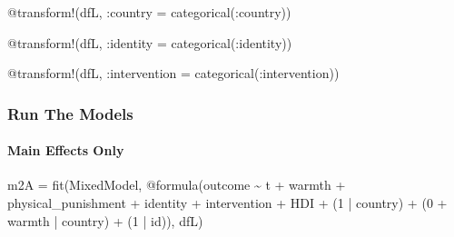 \documentclass[
  letterpaper,
  DIV=11,
  numbers=noendperiod]{scrreprt}
\let\oldparagraph\paragraph
\renewcommand{\paragraph}[1]{\oldparagraph{#1}\mbox{}}
\newenvironment{Shaded}{\begin{snugshade}}{\end{snugshade}}
\newcommand{\FloatTok}[1]{\textcolor[rgb]{0.68,0.00,0.00}{#1}}
\newcommand{\FunctionTok}[1]{\textcolor[rgb]{0.28,0.35,0.67}{#1}}
\newcommand{\NormalTok}[1]{\textcolor[rgb]{0.00,0.23,0.31}{#1}}
\newcommand{\OperatorTok}[1]{\textcolor[rgb]{0.37,0.37,0.37}{#1}}
\newcommand{\PreprocessorTok}[1]{\textcolor[rgb]{0.68,0.00,0.00}{#1}}
\begin{document}
\begin{Shaded}
\begin{Highlighting}[]
\PreprocessorTok{@transform}\NormalTok{!(dfL, }\OperatorTok{:}\NormalTok{country }\OperatorTok{=} \FunctionTok{categorical}\NormalTok{(}\OperatorTok{:}\NormalTok{country))}

\PreprocessorTok{@transform}\NormalTok{!(dfL, }\OperatorTok{:}\NormalTok{identity }\OperatorTok{=} \FunctionTok{categorical}\NormalTok{(}\OperatorTok{:}\NormalTok{identity))}

\PreprocessorTok{@transform}\NormalTok{!(dfL, }\OperatorTok{:}\NormalTok{intervention }\OperatorTok{=} \FunctionTok{categorical}\NormalTok{(}\OperatorTok{:}\NormalTok{intervention))}
\end{Highlighting}
\end{Shaded}

\subsubsection{Run The Models}\label{run-the-models-4}

\paragraph{Main Effects Only}\label{main-effects-only-2}

\begin{Shaded}
\begin{Highlighting}[]
\NormalTok{m2A }\OperatorTok{=} \FunctionTok{fit}\NormalTok{(MixedModel, }\PreprocessorTok{@formula}\NormalTok{(outcome }\OperatorTok{\textasciitilde{}}\NormalTok{ t }\OperatorTok{+}\NormalTok{ warmth }\OperatorTok{+} 
\NormalTok{                                 physical\_punishment }\OperatorTok{+} 
\NormalTok{                                 identity }\OperatorTok{+}\NormalTok{ intervention }\OperatorTok{+} 
\NormalTok{                                 HDI }\OperatorTok{+}
\NormalTok{                                 (}\FloatTok{1} \OperatorTok{|}\NormalTok{ country) }\OperatorTok{+} 
\NormalTok{                                 (}\FloatTok{0} \OperatorTok{+}\NormalTok{ warmth }\OperatorTok{|}\NormalTok{ country) }\OperatorTok{+}
\NormalTok{                                 (}\FloatTok{1} \OperatorTok{|}\NormalTok{ id)), dfL)}
\end{Highlighting}
\end{Shaded}
\end{document}
